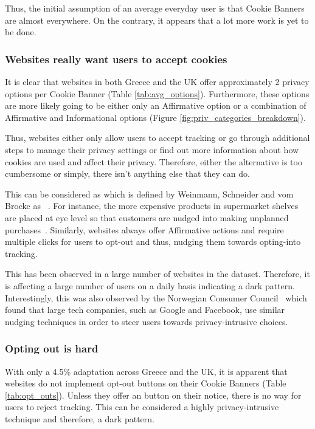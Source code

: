 \documentclass[../main.tex]{subfiles}
\begin{document}
Thus, the initial assumption of an average everyday user is that Cookie Banners are almost everywhere. On the contrary, it appears that a lot more work is yet to be done. 

\subsubsection{Websites really want users to accept cookies}
It is clear that websites in both Greece and the UK offer approximately 2 privacy options per Cookie Banner (Table \ref{tab:avg_options}). Furthermore, these options are more likely going to be either only an Affirmative option or a combination of Affirmative and Informational options (Figure \ref{fig:priv_categories_breakdown}). 

Thus, websites either only allow users to accept tracking or go through additional steps to manage their privacy settings or find out more information about how cookies are used and affect their privacy. Therefore, either the alternative is too cumbersome or simply, there isn’t anything else that they can do. 

This can be considered as  which is defined by Weinmann, Schneider and vom Brocke as ~\cite{weinmann2016digital}. For instance, the more expensive products in supermarket shelves are placed at eye level so that customers are nudged into making unplanned purchases~\cite{schneider2018digital}. Similarly, websites always offer Affirmative actions and require multiple clicks for users to opt-out and thus, nudging them towards opting-into tracking.

This has been observed in a large number of websites in the dataset. Therefore, it is affecting a large number of users on a daily basis indicating a dark pattern. Interestingly, this was also observed by the Norwegian Consumer Council~\cite{council2018deceived} which found that large tech companies, such as Google and Facebook, use similar nudging techniques in order to steer users towards privacy-intrusive choices.

\subsubsection{Opting out is hard}
With only a 4.5\% adaptation across Greece and the UK, it is apparent that websites do not implement opt-out buttons on their Cookie Banners (Table \ref{tab:opt_outs}). Unless they offer an  button on their notice, there is no way for users to reject tracking. This can be considered a highly privacy-intrusive technique and therefore, a dark pattern. 
\end{document}
